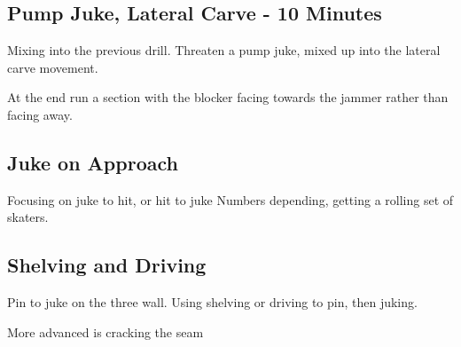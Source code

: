 \documentclass{journal}
\begin{document}
\subsection*{Pump Juke, Lateral Carve - 10 Minutes}
Mixing into the previous drill.
Threaten a pump juke, mixed up into the lateral carve movement.

At the end run a section with the blocker facing towards the jammer rather than facing away.

\subsection*{Juke on Approach}
Focusing on juke to hit, or hit to juke
Numbers depending, getting a rolling set of skaters.


\subsection*{Shelving and Driving}
Pin to juke on the three wall.
Using shelving or driving to pin, then juking.

More advanced is cracking the seam
\end{document}
